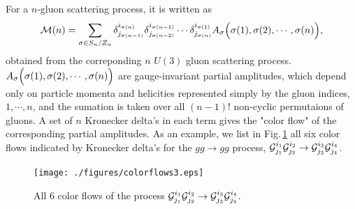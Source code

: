 \documentclass[a4paper,11pt]{article}
\begin{document}
 For a $n$-gluon scattering process, it is written as
\begin{equation}
 {\cal M}(n)=\sum_{\sigma\in S_n/Z_n}\delta^{i_{\sigma(n)}}_{j_{\sigma(n-1)}}
\delta^{i_{\sigma(n-1)}}_{j_{\sigma(n-2)}}\cdots\delta^{i_{\sigma(1)}}_{j_{\sigma(n)}}
A_{\sigma}\Bigl(\sigma(1),\sigma(2),\cdots,\sigma(n)\Bigr),
\label{eq:Mn}
\end{equation}
obtained from the correponding $n$ $U(3)$ gluon scattering process. $A_{\sigma}\Bigl(\sigma(1),\sigma(2),\cdots,\sigma(n)\Bigr)$ are
gauge-invariant partial
amplitudes, which depend only on particle momenta and
helicities represented simply by the gluon indices, $1,\cdots,n$, and
 the sumation is taken over all $(n-1)!$ non-cyclic permutaions of
gluons. A set of $n$ Kronecker delta's in each term gives the "color flow"
of the corresponding partial amplitudes. As an example, we list in Fig.\,\ref{fig:colorflows} all six color flows indicated by Kronecker delta's
for the  $gg\rightarrow gg$ process, ${\cal
G}_{j_1}^{i_1}{\cal G}_{j_2}^{i_2}\rightarrow{\cal G}_{j_3}^{i_3}{\cal
G}_{j_4}^{i_4}$.
\begin{figure}
\begin{center}
\texttt{[image: ./figures/colorflows3.eps]}
\caption{All 6 color flows of the process ${\cal
G}_{j_1}^{i_1}{\cal G}_{j_2}^{i_2}\rightarrow{\cal G}_{j_3}^{i_3}{\cal
G}_{j_4}^{i_4}$.}
\label{fig:colorflows}
\end{center}
\end{figure}
\end{document}
